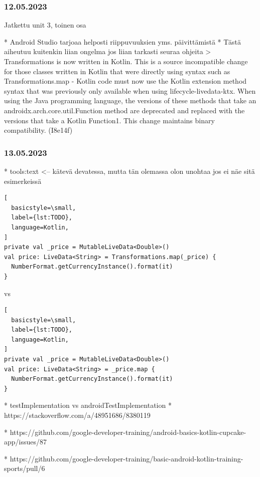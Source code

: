 \subsubsection{12.05.2023}

Jatkettu unit 3, toinen osa

* Android Studio tarjoaa helposti riippuvuuksien yms. päivittämistä
  * Tästä aiheutuu kuitenkin liian ongelma jos liian tarkasti seuraa ohjeita
  > Transformations is now written in Kotlin. This is a source incompatible change for those classes written in Kotlin that were directly using syntax such as Transformations.map - Kotlin code must now use the Kotlin extension method syntax that was previously only available when using lifecycle-livedata-ktx. When using the Java programming language, the versions of these methods that take an androidx.arch.core.util.Function method are deprecated and replaced with the versions that take a Kotlin Function1. This change maintains binary compatibility. (I8e14f)

\subsubsection{13.05.2023}

* tools:text <-- kätevä devatessa, mutta tän olemassa olon unohtaa jos ei näe sitä esimerkeissä

\begin{lstlisting}[
  basicstyle=\small,
  label={lst:TODO},
  language=Kotlin,
]
private val _price = MutableLiveData<Double>()
val price: LiveData<String> = Transformations.map(_price) {
  NumberFormat.getCurrencyInstance().format(it)
}
\end{lstlisting}

vs

\begin{lstlisting}[
  basicstyle=\small,
  label={lst:TODO},
  language=Kotlin,
]
private val _price = MutableLiveData<Double>()
val price: LiveData<String> = _price.map {
  NumberFormat.getCurrencyInstance().format(it)
}
\end{lstlisting}

* testImplementation vs androidTestImplementation
* https://stackoverflow.com/a/48951686/8380119

* https://github.com/google-developer-training/android-basics-kotlin-cupcake-app/issues/87

* https://github.com/google-developer-training/basic-android-kotlin-training-sports/pull/6

